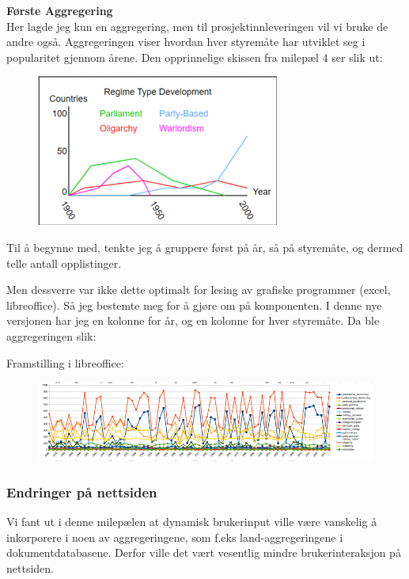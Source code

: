 \textbf{Første Aggregering}\\
Her lagde jeg kun en aggregering, men til prosjektinnleveringen vil vi bruke de andre også. Aggregeringen viser hvordan hver styremåte har utviklet seg i popularitet gjennom årene. Den opprinnelige skissen fra milepæl 4 ser slik ut:

\FigureCounter
\begin{figure}[H]
    \includegraphics[scale=1.0]{images/milepael5/regimeTypeGraphic.png}
\end{figure}

Til å begynne med, tenkte jeg å gruppere først på år, så på styremåte, og dermed telle antall opplistinger.


Men dessverre var ikke dette optimalt for lesing av grafiske programmer (excel, libreoffice). Så jeg bestemte meg for å gjøre om på komponenten. I denne nye versjonen har jeg en kolonne for år, og en kolonne for hver styremåte. Da ble aggregeringen slik:


Framstilling i libreoffice:

\FigureCounter
\begin{figure}[H]
    \includegraphics[width=\textwidth]{images/milepael5/libreOfficeGovPop.png}
\end{figure}

\subsubsection{Endringer på nettsiden}
Vi fant ut i denne milepælen at dynamisk brukerinput ville være vanskelig å inkorporere i noen av aggregeringene, som f.eks land-aggregeringene i dokumentdatabasene. Derfor ville det vært vesentlig mindre brukerinteraksjon på nettsiden.